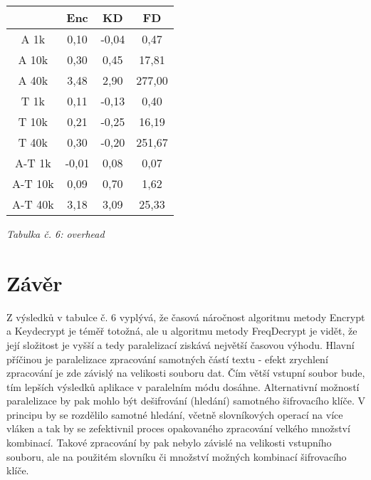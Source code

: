 \documentclass{article}
\begin{document}
\begin{center}
	\begin{tabular}{ c | c | c | c }
		 & Enc & KD & FD \\
		\hline
		\hline
		A 1k & 0,10 & -0,04 & 0,47 \\
		\hline
		A 10k & 0,30 & 0,45 & 17,81 \\
		\hline
		A 40k & 3,48 & 2,90 & 277,00 \\
		\hline
		T 1k & 0,11 & -0,13 & 0,40 \\
		\hline
		T 10k & 0,21 & -0,25 & 16,19 \\
		\hline
		T 40k & 0,30 & -0,20 & 251,67 \\
		\hline
		A-T 1k & -0,01 & 0,08 & 0,07 \\
		\hline
		A-T 10k & 0,09 & 0,70 & 1,62 \\
		\hline
		A-T 40k & 3,18 & 3,09 & 25,33 \\
	\end{tabular}
	\newline
	\textit{Tabulka č. 6: overhead}
\end{center}

\section{Závěr}
Z výsledků v tabulce č. 6 vyplývá, že časová náročnost algoritmu metody Encrypt a Keydecrypt je téměř totožná, ale u algoritmu metody FreqDecrypt je vidět, že její složitost je vyšší a tedy paralelizací ziskává největší časovou výhodu. Hlavní příčinou je paralelizace zpracování samotných částí textu - efekt zrychlení zpracování je zde závislý na velikosti souboru dat. Čím větší vstupní soubor bude, tím lepších výsledků aplikace v paralelním módu dosáhne.
Alternativní možností paralelizace by pak mohlo být dešifrování (hledání) samotného šifrovacího klíče. V principu by se rozdělilo samotné hledání, včetně slovníkových operací na více vláken a tak by se zefektivnil proces opakovaného zpracování velkého množství kombinací. Takové zpracování by pak nebylo závislé na velikosti vstupního souboru, ale na použitém slovníku či množství možných kombinací šifrovacího klíče.
\end{document}
